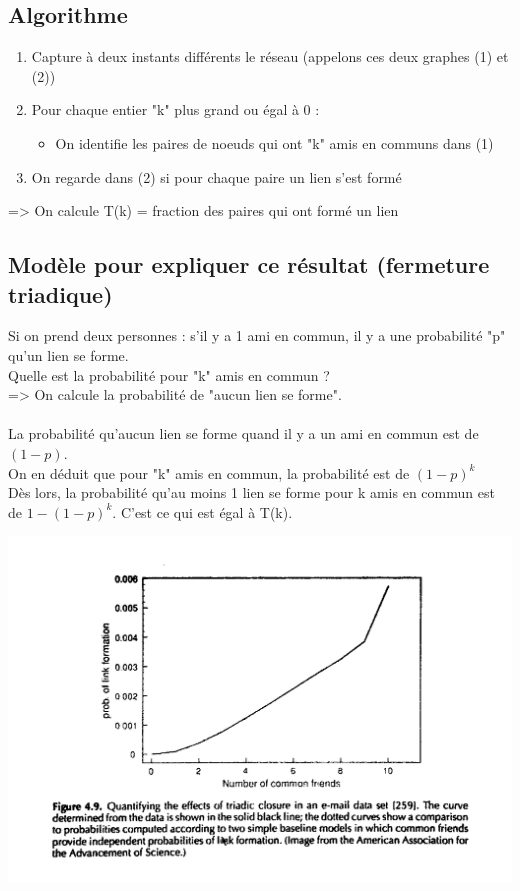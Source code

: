 \subsection{Algorithme}
\begin{enumerate}
\item Capture à deux instants différents le réseau (appelons ces deux graphes (1) et (2))
\item Pour chaque entier "k" plus grand ou égal à 0 :
\begin{itemize}
	\item On identifie les paires de noeuds qui ont "k" amis en communs dans (1)
\end{itemize}
\item On regarde dans (2) si pour chaque paire un lien s'est formé
\end{enumerate}
=> On calcule T(k) = fraction des paires qui ont formé un lien

\subsection{Modèle pour expliquer ce résultat (fermeture triadique)}
Si on prend deux personnes : s'il y a 1 ami en commun, il y a une probabilité "p" qu'un lien se forme.\\
Quelle est la probabilité pour "k" amis en commun ?\\
=> On calcule la probabilité de "aucun lien se forme".

\paragraph*{}
La probabilité qu'aucun lien se forme quand il y a un ami en commun est de $(1-p)$.\\
On en déduit que pour "k" amis en commun, la probabilité est de $ (1-p)^{k}$\\
Dès lors, la probabilité qu'au moins 1 lien se forme pour k amis en commun est de $ 1-(1-p)^{k}$. C'est ce qui est égal à T(k).

\includegraphics[width=\textwidth]{images/emailFriends.jpg}

